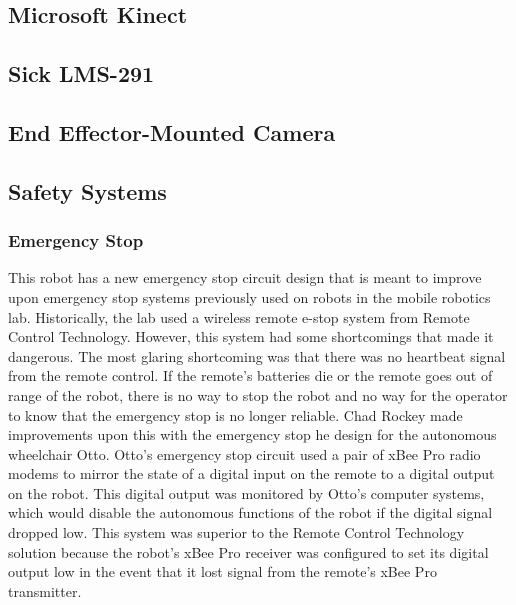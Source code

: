\documentclass{cwru}
\begin{document}
\subsection[Microsoft Kinect]{Microsoft Kinect}
\subsection[Sick LMS{}-291]{Sick LMS-291}
\subsection[End Effector{}-Mounted Camera]{End Effector-Mounted Camera}
\subsection[Safety Systems]{Safety Systems}
\subsubsection[Emergency Stop]{Emergency Stop}
This robot has a new emergency stop circuit design that is meant to improve upon emergency stop systems previously used on robots in the mobile robotics lab. Historically, the lab used a wireless remote e-stop system from Remote Control Technology. However, this system had some shortcomings that made it dangerous. The most glaring shortcoming was that there was no heartbeat signal from the remote control. If the remote{\textquoteright}s batteries die or the remote goes out of range of the robot, there is no way to stop the robot and no way for the operator to know that the emergency stop is no longer reliable. Chad Rockey made improvements upon this with the emergency stop he design for the autonomous wheelchair Otto. Otto{\textquoteright}s emergency stop circuit used a pair of xBee Pro radio modems to mirror the state of a digital input on the remote to a digital output on the robot. This digital output was monitored by Otto{\textquoteright}s computer systems, which would disable the autonomous functions of the robot if the digital signal dropped low. This system was superior to the Remote Control Technology solution because the robot{\textquoteright}s xBee Pro receiver was configured to set its digital output low in the event that it lost signal from the remote{\textquoteright}s xBee Pro transmitter.
\end{document}
